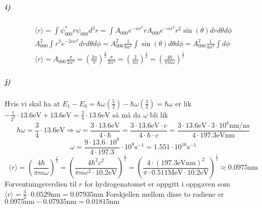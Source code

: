 \documentclass[11pt, A4paper,norsk]{article}
\begin{document}
			\subparagraph{i)}
				\begin{gather*}
\langle r \rangle = \int \psi_{000}^{*} r \psi_{000} d^3r = \int A_{000} e^{- \alpha r^2} r A_{000} e^{- \alpha r^2} r^2 \sin(\theta) dr d\theta d\phi \\
A_{000}^2 \int r^3 e^{- 2 \alpha r^2} dr d\theta d\phi = A_{000}^2 \frac{1}{8 \alpha^2} \int \sin(\theta) d\theta d\phi = A_{000}^2 \frac{1}{4 \alpha^2} \int d\phi \\
\langle r \rangle = A_{000} \frac{\pi}{2 \alpha^2} = \left( \frac{2 \alpha}{\pi} \right)^{\frac{3}{2}} \frac{\pi}{2 \alpha^2} = \left( \frac{2}{\pi \alpha} \right)^{\frac{1}{2}} = \left( \frac{4 \hbar}{\pi m \omega} \right)^{\frac{1}{2}}
				\end{gather*}










			\subparagraph{j)}
				\begin{flushleft}
Hvis vi skal ha at $E_1 - E_0 = \hbar \omega \left( \frac{5}{2} \right) - \hbar \omega \left( \frac{3}{2} \right) = \hbar \omega$ er lik $- \frac{1}{2^2} \cdot 13.6 \text{eV} + 13.6 \text{eV} = \frac{3}{4} \cdot 13.6 \text{eV}$ så må da $\omega$ bli lik
$$\hbar \omega = \frac{3}{4} \cdot 13.6 \text{eV} \Rightarrow \omega = \frac{3 \cdot 13.6 \text{eV}}{4 \cdot \hbar} = \frac{3 \cdot 13.6 \text{eV} \cdot c}{4 \cdot \hbar \cdot c} = \frac{3 \cdot 13.6 \text{eV} \cdot 3 \cdot 10^{8} \text{nm}/\text{ns}}{4 \cdot 197.3 \text{eVnm}}$$
$$\omega = \frac{9 \cdot 13.6 \cdot 10^{8}}{4 \cdot 197.3} \cdot 10^{9} \text{s}^{-1} = 1.551 \cdot 10^{16} \text{s}^{-1}$$
$$\langle r \rangle = \left( \frac{4 \hbar}{\pi m \omega} \right)^{\frac{1}{2}} = \left( \frac{4 \hbar^2 c^2}{\pi m c^2 \cdot 10.2 \text{eV}} \right)^{\frac{1}{2}} = \left( \frac{4 \cdot \left( 197.3 \text{eVnm} \right)^2}{\pi \cdot 0.511 \text{MeV} \cdot 10.2 \text{eV}} \right)^{\frac{1}{2}} \approx 0.0975 \text{nm}$$
Forventningsverdien til $r$ for hydrogenatomet er oppgitt i oppgaven som $\langle r \rangle = \frac{3}{2} \cdot 0.0529 \text{nm} = 0.07935 \text{nm}$
Forskjellen mellom disse to radiene er $0.0975 \text{nm} - 0.07935 \text{nm} = 0.01815 \text{nm}$
				\end{flushleft}
\end{document}
